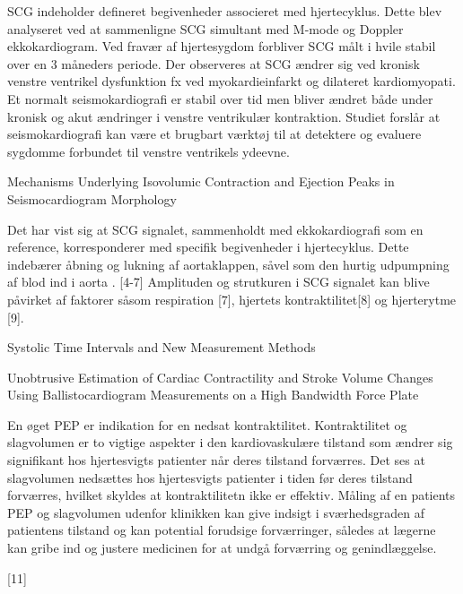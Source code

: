 SCG indeholder defineret begivenheder associeret med hjertecyklus. Dette blev analyseret ved at sammenligne SCG simultant med M-mode og Doppler ekkokardiogram. Ved fravær af hjertesygdom forbliver SCG målt i hvile stabil over en 3 måneders periode. Der observeres at SCG ændrer sig ved kronisk venstre ventrikel dysfunktion fx ved myokardieinfarkt og dilateret kardiomyopati. Et normalt seismokardiografi er stabil over tid men bliver ændret både under kronisk og akut ændringer i venstre ventrikulær kontraktion. Studiet forslår at seismokardiografi kan være et brugbart værktøj til at detektere og evaluere sygdomme forbundet til venstre ventrikels ydeevne. 


Mechanisms Underlying Isovolumic Contraction and Ejection Peaks in Seismocardiogram Morphology

Det har vist sig at SCG signalet, sammenholdt med  ekkokardiografi som en reference, korresponderer med specifik begivenheder i hjertecyklus. Dette indebærer åbning og lukning af aortaklappen, såvel som den hurtig udpumpning af blod ind i aorta \citep{inan2015}. [4-7] Amplituden og strutkuren i SCG signalet kan blive påvirket af faktorer såsom respiration [7], hjertets kontraktilitet[8] og hjerterytme [9]. 

Systolic Time Intervals and New Measurement Methods
\citep{Tavakolian2016}


Unobtrusive Estimation of Cardiac Contractility and Stroke Volume Changes Using Ballistocardiogram Measurements on a High Bandwidth Force Plate

En øget PEP er indikation for en nedsat kontraktilitet. Kontraktilitet og slagvolumen er to vigtige aspekter i den kardiovaskulære tilstand som ændrer sig signifikant hos hjertesvigts patienter når deres tilstand forværres.  Det ses at slagvolumen nedsættes hos hjertesvigts patienter i tiden før deres tilstand forværres, hvilket skyldes at kontraktilitetn ikke er effektiv. Måling af en patients PEP og slagvolumen udenfor klinikken kan give indsigt i sværhedsgraden af patientens tilstand og kan potential forudsige forværringer, således at lægerne kan gribe ind og justere medicinen for at undgå forværring og genindlæggelse. \citep{Ashouri2016}


[11]





